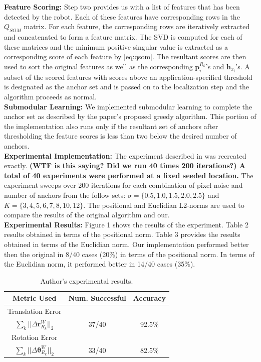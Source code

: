 \documentclass[10pt,twocolumn,letterpaper]{article}
\begin{document}
\textbf{Feature Scoring:} Step two provides us with a list of features that has been detected by the robot. Each of these features have corresponding rows in the $Q_{SOM}$ matrix. For each feature, the corresponding rows are iteratively extracted and concatenated to form a feature matrix. 
The SVD is computed for each of these matrices and the minimum positive singular value is extracted as a
 corresponding score of each feature by \eqref{eq:qsom}. 
 The resultant scores are then used to sort the original features as well 
as the corresponding $\boldsymbol{p}_{i}^{R_k}$'s and $\boldsymbol{h}_{x_i}$'s. A subset of the scored features with scores above an 
application-specified threshold is designated as the anchor set and is passed on to the localization step and the algorithm proceeds as normal.\\
\indent{}\textbf{Submodular Learning:} We implemented submodular learning to complete the anchor set as described by the paper's proposed greedy algorithm. This portion of the implementation also runs only if the resultant set of anchors after thresholding the feature scores is less than two below the desired number of 
anchors.\\
\indent{}\textbf{Experimental Implementation:} The experiment described in \cite{Zhang_2015_CVPR} was recreated exactly.
\textbf{(WTF is this saying? Did we run 40 times 200 iterations?) A total of 40 experiments were performed at a fixed seeded location.} The experiment sweeps over 200 iterations for each combination of pixel noise and number of anchors from the follow sets: $\sigma=\{0.5, 1.0, 1.5, 2.0, 2.5\} $ and $ K = \{ 3, 4, 5, 6, 7, 8, 10, 12 \}$. The positional and Euclidian L2-norms are used to compare the results of the original algorithm and our.\\
\indent{}\textbf{Experimental Results:} Figure 1 shows the results of the experiment. Table 2 results obtained in terms of the positional norm. 
Table 3 provides the results obtained in terms of the Euclidian norm. 
Our implementation performed better then the original in 8/40 cases (20\%) in terms of the positional norm. 
In terms of the Euclidian norm, it performed better in 14/40 cases (35\%).
\begin{table}[h]
\begin{center}
\begin{tabular}{|c|c|c|}
\hline
Metric Used & Num. Successful & Accuracy  \\
\hline
 Translation Error &   &   \\
$ \sum_k || \Delta \boldsymbol{r}_{R_k}^W ||_2 $ & 37/40 & 92.5\% \\ 
\hline
Rotation Error &   &   \\
$ \sum_k || \Delta \boldsymbol{\theta}_{R_k}^W ||_2 $ & 33/40 & 82.5\% \\
\hline
\end{tabular}
\end{center}
\caption{Author's experimental results.}
\end{table}
\end{document}
